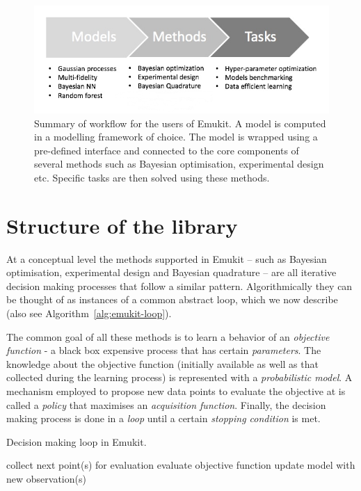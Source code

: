 \begin{figure}[h]
    \centering
    \includegraphics[width=\columnwidth]{workflow.png}  
    \caption{Summary of workflow for the users of Emukit. A model is computed in a modelling framework of choice. The model is wrapped using a pre-defined interface and connected to the core components of several methods such as Bayesian optimisation, experimental design etc. Specific tasks are then solved using these methods.}
    \label{figure:workflow}
\end{figure}

\section{Structure of the library}\label{sec:lib-structure}

At a conceptual level the methods supported in Emukit -- such as Bayesian optimisation, experimental design and Bayesian quadrature -- are all iterative decision making processes that follow a similar pattern. Algorithmically they can be thought of as instances of a common abstract loop, which we now describe (also see Algorithm~\ref{alg:emukit-loop}).

The common goal of all these methods is to learn a behavior of an \textit{objective function} - a black box expensive process that has certain \textit{parameters}. The knowledge about the objective function (initially available as well as that collected during the learning process) is represented with a \textit{probabilistic model}. A mechanism employed to propose new data points to evaluate the objective at is called a \emph{policy} that maximises an \textit{acquisition function}. Finally, the decision making process is done in a \textit{loop} until a certain \textit{stopping condition} is met. 

\begin{algorithm}[H]
  \caption{Decision making loop in Emukit.}
  \label{alg:emukit-loop}
  \begin{algorithmic}[1]
      \State collect next point(s) for evaluation
      \State evaluate objective function
      \State update model with new observation(s)
    \EndWhile
  \end{algorithmic}
\end{algorithm}

